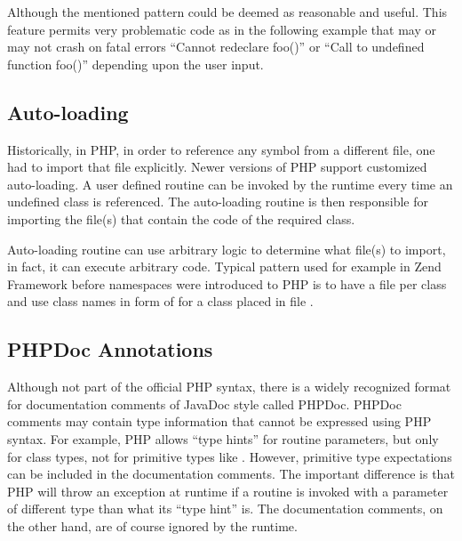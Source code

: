     Although the mentioned pattern could be deemed as 
    reasonable and useful. This feature permits very problematic 
    code as in the following example that may or may not 
    crash on fatal errors ``Cannot redeclare foo()'' or 
    ``Call to undefined function foo()'' depending upon 
    the user input.
    
    
                
    \subsection{Auto-loading}
    Historically, in PHP, in order to reference any symbol 
    from a different file, one had to import that 
    file explicitly. Newer versions of PHP support  
    customized auto-loading. A user defined routine 
    can be invoked by the runtime every time an 
    undefined class is referenced. 
    The auto-loading routine is then responsible for 
    importing the file(s) that contain the code of the 
    required class. 
    
    Auto-loading routine can use arbitrary logic to 
    determine what file(s) to import, in fact, it can 
    execute arbitrary code. Typical 
    pattern used for example in 
    Zend Framework \cite{zendframework} before namespaces were 
    introduced to PHP is to have a file per class and use 
    class names in form of 
     for 
    a class placed in file 
    .
    
    \subsection{PHPDoc Annotations}
    Although not part of the official PHP syntax, 
    there is a widely recognized format for documentation 
    comments of JavaDoc style called PHPDoc. PHPDoc comments 
    may contain type information that cannot be expressed using 
    PHP syntax. For example, PHP allows ``type hints'' 
    for routine parameters, but only for class types, 
    not for primitive types like . However, 
    primitive type expectations can be included in the 
    documentation comments. The important difference 
    is that PHP will throw an exception at runtime if 
    a routine is invoked with a parameter of different 
    type than what its ``type hint'' is. The documentation
    comments, on the other hand, are of course ignored 
    by the runtime.
    

